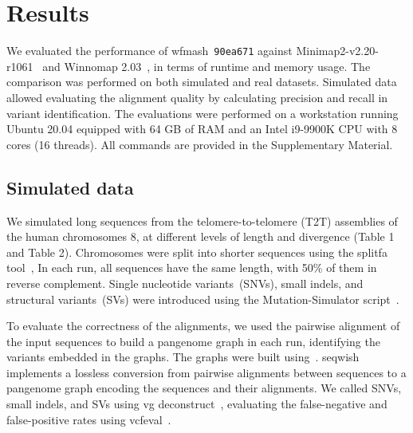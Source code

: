\documentclass{bioinfo}
\newcommand{\wfmash}{wfmash}
\begin{document}
    \section{Results}

    We evaluated the performance of \wfmash\ \texttt{90ea671} against Minimap2-v2.20-r1061~\citep{29750242} and Winnomap 2.03~\citep{XXX}, in
    terms of runtime and memory usage. The comparison was performed on both simulated and real datasets. Simulated
    data allowed evaluating the alignment quality by calculating precision and recall in variant identification.
    The evaluations were performed on a workstation running Ubuntu 20.04 equipped with 64 GB of RAM and an Intel i9-9900K
    CPU with 8 cores (16 threads). All commands are provided in the Supplementary Material.

    \subsection{Simulated data}
    We simulated long sequences from the telomere-to-telomere (T2T) assemblies of the human chromosomes 8,
    at different levels of length and divergence (Table 1 and Table 2). Chromosomes were split into shorter
    sequences using the splitfa tool~\citep{splitfa}, In each run, all sequences have the same length, with 50\%
    of them in reverse complement. Single nucleotide variants~(SNVs), small indels, and structural variants~(SVs)
    were introduced using the Mutation-Simulator script~\citep{32780803}.

    To evaluate the correctness of the alignments, we used the pairwise alignment of the input sequences to build
    a pangenome graph in each run, identifying the variants embedded in the graphs. The graphs were built using~\citep{seqwish}.
    seqwish implements a lossless conversion from pairwise alignments between sequences to a pangenome graph encoding the
    sequences and their alignments. We called SNVs, small indels, and SVs using vg deconstruct~\citep{30125266},
    evaluating the false-negative and false-positive rates using vcfeval~\citep{vcfeval}.
\end{document}
